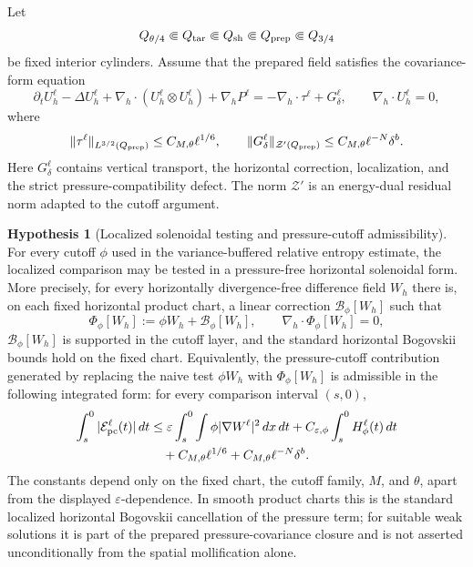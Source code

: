 \documentclass[11pt]{article}
\numberwithin{equation}{section}
\theoremstyle{plain}
\theoremstyle{definition}
\newtheorem{hypothesis}{Hypothesis}[section]
\theoremstyle{remark}
\newcommand{\nabh}{\nabla_h}
\newcommand{\divh}{\nabla_h\!\cdot}
\begin{document}
Let
\[
        Q_{\theta/4}\Subset Q_{\rm tar}\Subset Q_{\rm sh}\Subset Q_{\rm prep}\Subset Q_{3/4}
\]
be fixed interior cylinders.  Assume that the prepared field satisfies the covariance-form equation
\begin{equation}\label{pI:eq:prepared-covariance-form}
        \partial_t U_h^\ell-
        \Delta U_h^\ell+
        \divh(U_h^\ell\otimes U_h^\ell)
        +\nabh P^\ell
        =-
        \divh\tau^\ell+G_\delta^\ell,
        \qquad
        \divh U_h^\ell=0,
\end{equation}
where
\begin{equation}\label{pI:eq:tau-G-bounds}
        \|\tau^\ell\|_{L^{3/2}(Q_{\rm prep})}
        \le C_{M,\theta}\ell^{1/6},
        \qquad
        \|G_\delta^\ell\|_{\mathcal Z'(Q_{\rm prep})}
        \le C_{M,\theta}\ell^{-N}\delta^b .
\end{equation}
Here \(G_\delta^\ell\) contains vertical transport, the horizontal correction, localization, and the strict pressure-compatibility defect.  The norm \(\mathcal Z'\) is an energy-dual residual norm adapted to the cutoff argument.


\begin{hypothesis}[Localized solenoidal testing and pressure-cutoff admissibility]\label{pI:hyp:localized-pressure-cutoff}
For every cutoff \(\phi\) used in the variance-buffered relative entropy estimate, the localized comparison may be tested in a pressure-free horizontal solenoidal form.  More precisely, for every horizontally divergence-free difference field \(W_h\) there is, on each fixed horizontal product chart, a linear correction \(\mathcal B_\phi[W_h]\) such that
\[
        \Phi_\phi[W_h]:=\phi W_h+\mathcal B_\phi[W_h],
        \qquad
        \nabla_h\cdot\Phi_\phi[W_h]=0,
\]
\(\mathcal B_\phi[W_h]\) is supported in the cutoff layer, and the standard horizontal Bogovskii bounds hold on the fixed chart.  Equivalently, the pressure-cutoff contribution generated by replacing the naive test \(\phi W_h\) with \(\Phi_\phi[W_h]\) is admissible in the following integrated form: for every comparison interval \((s,0)\),
\begin{equation}\label{pI:eq:pressure-cutoff-admissibility}
\begin{aligned}
        \int_s^0 |\mathcal E_{\rm pc}^\ell(t)|\,dt
        &\le
        \varepsilon\int_s^0\int \phi|\nabla W^\ell|^2\,dx\,dt
        +C_{\varepsilon,\phi}\int_s^0 H_\phi^\ell(t)\,dt  \\
        &\quad
        +C_{M,\theta}\ell^{1/6}
        +C_{M,\theta}\ell^{-N}\delta^b .
\end{aligned}
\end{equation}
The constants depend only on the fixed chart, the cutoff family, \(M\), and \(\theta\), apart from the displayed \(\varepsilon\)-dependence.  In smooth product charts this is the standard localized horizontal Bogovskii cancellation of the pressure term; for suitable weak solutions it is part of the prepared pressure-covariance closure and is not asserted unconditionally from the spatial mollification alone.
\end{hypothesis}
\end{document}
